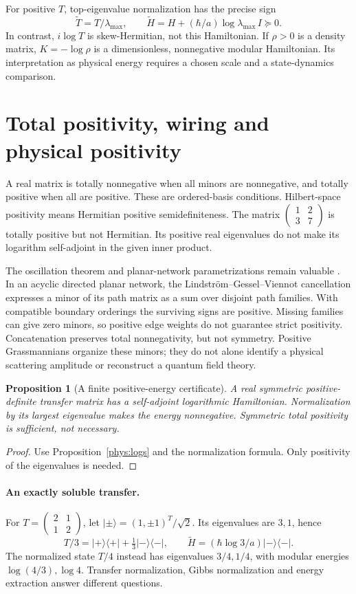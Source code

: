 \documentclass[11pt,oneside,openany]{book}
\newtheorem{proposition}[theorem]{Proposition}
\theoremstyle{definition}\newtheorem{definition}[theorem]{Definition}
\theoremstyle{remark}\newtheorem{remark}[theorem]{Remark}
\begin{document}
For positive $T$, top-eigenvalue normalization has the precise sign
\[
 \widetilde T=T/\lambda_{\max},\qquad
 \widetilde H=H+(\hbar/a)\log\lambda_{\max}\,I\succeq0.
\]
In contrast, $i\log T$ is skew-Hermitian, not this Hamiltonian. If
$\rho>0$ is a density matrix, $K=-\log\rho$ is a dimensionless,
nonnegative modular Hamiltonian. Its interpretation as physical energy
requires a chosen scale and a state-dynamics comparison.

\section{Total positivity, wiring and physical positivity}
A real matrix is totally nonnegative when all minors are nonnegative, and
totally positive when all are positive. These are ordered-basis conditions.
Hilbert-space positivity means Hermitian positive semidefiniteness. The
matrix $\left(\begin{smallmatrix}1&2\\3&7\end{smallmatrix}\right)$ is totally
positive but not Hermitian. Its positive real eigenvalues do not make its
logarithm self-adjoint in the given inner product.

The oscillation theorem and planar-network parametrizations remain valuable
\cite{PhysFominZelevinsky}. In an acyclic directed planar network, the
Lindstr\"om--Gessel--Viennot cancellation expresses a minor of its path
matrix as a sum over disjoint path families. With compatible boundary
orderings the surviving signs are positive. Missing families can give zero
minors, so positive edge weights do not guarantee strict positivity.
Concatenation preserves total nonnegativity, but not symmetry. Positive
Grassmannians organize these minors; they do not alone identify a physical
scattering amplitude or reconstruct a quantum field theory.

\begin{proposition}[A finite positive-energy certificate]
A real symmetric positive-definite transfer matrix has a self-adjoint
logarithmic Hamiltonian. Normalization by its largest eigenvalue makes the
energy nonnegative. Symmetric total positivity is sufficient, not necessary.
\end{proposition}
\begin{proof}
Use Proposition~\ref{phys:logs} and the normalization formula. Only
positivity of the eigenvalues is needed.
\end{proof}

\paragraph{An exactly soluble transfer.}
For $T=\left(\begin{smallmatrix}2&1\\1&2\end{smallmatrix}\right)$, let
$|\pm\rangle=(1,\pm1)^T/\sqrt2$. Its eigenvalues are $3,1$, hence
\[
 T/3=|+\rangle\langle+|+\tfrac13|-\rangle\langle-|,
 \qquad \widetilde H=(\hbar\log3/a)|-\rangle\langle-|.
\]
The normalized state $T/4$ instead has eigenvalues $3/4,1/4$, with modular
energies $\log(4/3),\log4$. Transfer normalization, Gibbs normalization and
energy extraction answer different questions.
\end{document}
